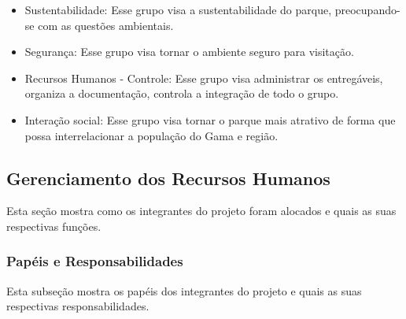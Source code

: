 \begin{itemize}
    \item Sustentabilidade: Esse grupo visa a sustentabilidade do parque, preocupando-se com as quest\~oes ambientais.
	\item Seguran\c{c}a: Esse grupo visa tornar o ambiente seguro para visita\c{c}\~ao.
	\item Recursos Humanos - Controle: Esse grupo visa administrar os entreg\'aveis, organiza a documenta\c{c}\~ao, controla a integra\c{c}\~ao de todo o grupo.
	\item Interação social: Esse grupo visa tornar o parque mais atrativo de forma que possa interrelacionar a população do Gama e região.
\end{itemize}

\subsection{Gerenciamento dos Recursos Humanos}

Esta se\c{c}\~ao mostra como os integrantes do projeto foram alocados e quais as suas respectivas fun\c{c}\~oes.

\subsubsection{Pap\'eis e Responsabilidades}
Esta subse\c{c}\~ao mostra os pap\'eis dos integrantes do projeto e quais as suas respectivas responsabilidades.

